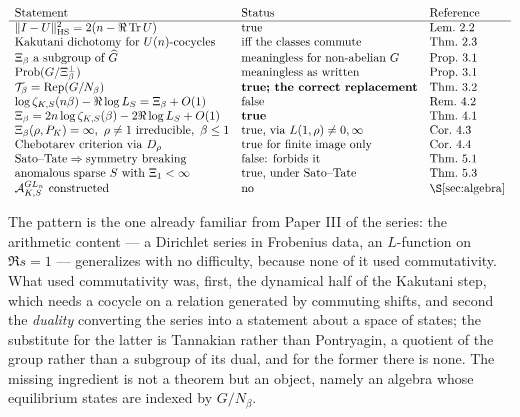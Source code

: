 \documentclass[11pt]{amsart}
\numberwithin{equation}{section}
\theoremstyle{definition}
\theoremstyle{remark}
\newcommand{\cA}{\mathcal{A}}
\newcommand{\cT}{\mathcal{T}}
\newcommand{\Rep}{\operatorname{Rep}}
\newcommand{\Tr}{\operatorname{Tr}}
\newcommand{\HS}{\mathrm{HS}}
\newcommand{\Prob}{\operatorname{Prob}}
\begin{document}
\[
\begin{array}{lll}
\text{Statement} & \text{Status} & \text{Reference}\\\hline
\|I-U\|_{\HS}^2=2(n-\Re\Tr U) & \text{true} & \text{Lem.~2.2}\\
\text{Kakutani dichotomy for }U(n)\text{-cocycles} & \text{iff the classes commute} & \text{Thm.~2.3}\\
\Xi_\beta\ \text{a subgroup of }\widehat G & \text{meaningless for non-abelian }G & \text{Prop.~3.1}\\
\Prob(G/\Xi_\beta^\perp) & \text{meaningless as written} & \text{Prop.~3.1}\\
\cT_\beta=\Rep(G/N_\beta) & \textbf{true; the correct replacement} & \text{Thm.~3.2}\\
\log\zeta_{K,S}(n\beta)-\Re\log L_S=\Xi_\beta+O(1) & \text{false} & \text{Rem.~4.2}\\
\Xi_\beta=2n\log\zeta_{K,S}(\beta)-2\Re\log L_S+O(1) & \textbf{true} & \text{Thm.~4.1}\\
\Xi_\beta(\rho,P_K)=\infty,\ \rho\ne1\ \text{irreducible},\ \beta\le1 & \text{true, via }L(1,\rho)\ne0,\infty & \text{Cor.~4.3}\\
\text{Chebotarev criterion via }D_\rho & \text{true for finite image only} & \text{Cor.~4.4}\\
\text{Sato--Tate}\Rightarrow\text{symmetry breaking} & \text{false: forbids it} & \text{Thm.~5.1}\\
\text{anomalous sparse }S\ \text{with}\ \Xi_1<\infty & \text{true, under Sato--Tate} & \text{Thm.~5.3}\\
\cA^{GL_n}_{K,S}\ \text{constructed} & \text{no} & \S\ref{sec:algebra}
\end{array}
\]

The pattern is the one already familiar from Paper III of the series: the arithmetic
content --- a Dirichlet series in Frobenius data, an $L$-function on $\Re s=1$ ---
generalizes with no difficulty, because none of it used commutativity. What used
commutativity was, first, the dynamical half of the Kakutani step, which needs a cocycle
on a relation generated by commuting shifts, and second the \emph{duality} converting the
series into a statement about a space of states; the substitute for the latter is
Tannakian rather than Pontryagin, a quotient of the group rather than a subgroup of its
dual, and for the former there is none. The missing ingredient is not a theorem but an
object, namely an algebra whose equilibrium states are indexed by $G/N_\beta$.
\end{document}
